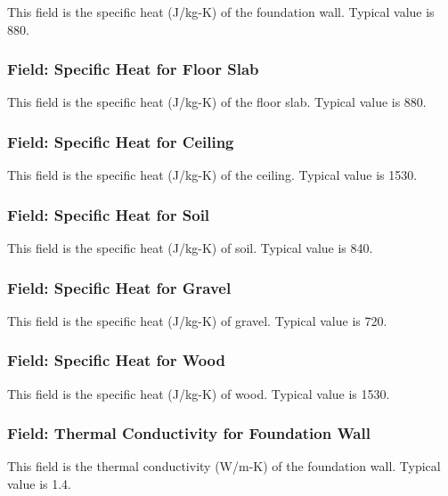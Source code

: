 This field is the specific heat (J/kg-K) of the foundation wall. Typical value is 880.

\subsubsection{Field: Specific Heat for Floor Slab}\label{field-specific-heat-for-floor-slab}

This field is the specific heat (J/kg-K) of the floor slab. Typical value is 880.

\subsubsection{Field: Specific Heat for Ceiling}\label{field-specific-heat-for-ceiling}

This field is the specific heat (J/kg-K) of the ceiling. Typical value is 1530.

\subsubsection{Field: Specific Heat for Soil}\label{field-specific-heat-for-soil}

This field is the specific heat (J/kg-K) of soil. Typical value is 840.

\subsubsection{Field: Specific Heat for Gravel}\label{field-specific-heat-for-gravel}

This field is the specific heat (J/kg-K) of gravel. Typical value is 720.

\subsubsection{Field: Specific Heat for Wood}\label{field-specific-heat-for-wood}

This field is the specific heat (J/kg-K) of wood. Typical value is 1530.

\subsubsection{Field: Thermal Conductivity for Foundation Wall}\label{field-thermal-conductivity-for-foundation-wall}

This field is the thermal conductivity (W/m-K) of the foundation wall. Typical value is 1.4.

